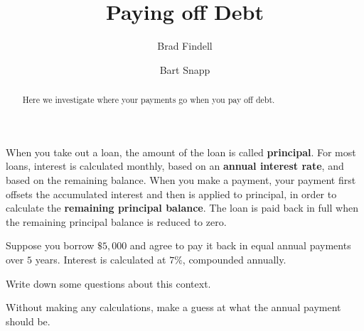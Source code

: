 \documentclass[handout,space,nooutcomes]{ximera}
\title{Paying off Debt}
\author{Brad Findell \and Bart Snapp}
\begin{document}
\begin{abstract}
Here we investigate where your payments go when you pay off debt.
\end{abstract}
\maketitle

When you take out a loan, the amount of the loan is called
\textbf{principal}.  For most loans, interest is calculated monthly,
based on an \textbf{annual interest rate}, and based on the remaining
balance.  When you make a payment, your payment first offsets the
accumulated interest and then is applied to principal, in order to
calculate the \textbf{remaining principal balance}.  The loan is paid
back in full when the remaining principal balance is reduced to zero.

\begin{question}[2.5in]
Suppose you borrow $\$5,000$ and agree to pay it back in equal annual
payments over $5$ years.  Interest is calculated at $7\%$,
compounded annually. 

Write down some questions about this context.  


\end{question}


\begin{question}[1in]
Without making any calculations, make a guess at what the annual payment should be.  
\begin{freeResponse}
\end{freeResponse}
\end{question}
\end{document}

